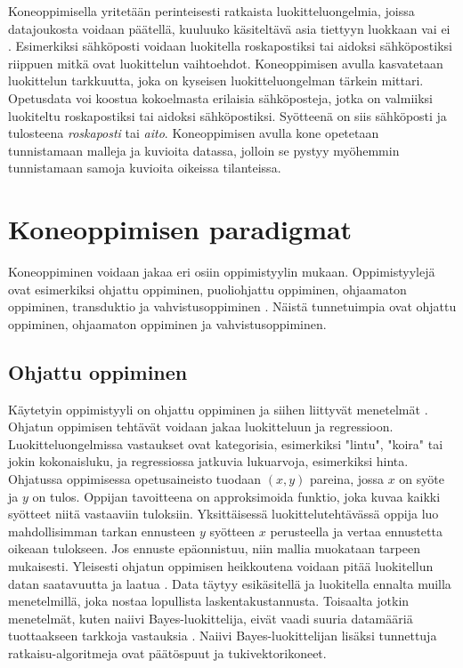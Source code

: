\documentclass[utf8]{gradu3}
\begin{document}
Koneoppimisella yritetään perinteisesti ratkaista luokitteluongelmia, joissa datajoukosta voidaan päätellä, kuuluuko käsiteltävä asia tiettyyn luokkaan vai ei \parencite{jordan2015machine}. Esimerkiksi sähköposti voidaan luokitella roskapostiksi tai aidoksi sähköpostiksi riippuen mitkä ovat luokittelun vaihtoehdot. Koneoppimisen avulla kasvatetaan luokittelun tarkkuutta, joka on kyseisen luokitteluongelman tärkein mittari. Opetusdata voi koostua kokoelmasta erilaisia sähköposteja, jotka on valmiiksi luokiteltu roskapostiksi tai aidoksi sähköpostiksi. Syötteenä on siis sähköposti ja tulosteena \textit{roskaposti} tai \textit{aito}. Koneoppimisen avulla kone opetetaan tunnistamaan malleja ja kuvioita datassa, jolloin se pystyy myöhemmin tunnistamaan samoja kuvioita oikeissa tilanteissa.

\section{Koneoppimisen paradigmat}

Koneoppiminen voidaan jakaa eri osiin oppimistyylin mukaan. Oppimistyylejä ovat esimerkiksi ohjattu oppiminen, puoliohjattu oppiminen, ohjaamaton oppiminen, transduktio ja vahvistusoppiminen \parencite{das2017survey}. Näistä tunnetuimpia ovat ohjattu oppiminen, ohjaamaton oppiminen ja vahvistusoppiminen.

\subsection{Ohjattu oppiminen}

Käytetyin oppimistyyli on ohjattu oppiminen ja siihen liittyvät menetelmät \parencite{jordan2015machine,nasteski2017overview}. Ohjatun oppimisen tehtävät voidaan jakaa luokitteluun ja regressioon. Luokitteluongelmissa vastaukset ovat kategorisia, esimerkiksi "lintu", "koira" tai jokin kokonaisluku, ja regressiossa jatkuvia lukuarvoja, esimerkiksi hinta. Ohjatussa oppimisessa opetusaineisto tuodaan \((x,y)\) pareina, jossa \(x\) on syöte ja \(y\) on tulos. Oppijan tavoitteena on approksimoida funktio, joka kuvaa kaikki syötteet niitä vastaaviin tuloksiin. Yksittäisessä luokittelutehtävässä oppija luo mahdollisimman tarkan ennusteen \(y\) syötteen \(x\) perusteella ja vertaa ennustetta oikeaan tulokseen. Jos ennuste epäonnistuu, niin mallia muokataan tarpeen mukaisesti. Yleisesti ohjatun oppimisen heikkoutena voidaan pitää luokitellun datan saatavuutta ja laatua \parencite{das2017survey}. Data täytyy esikäsitellä ja luokitella ennalta muilla menetelmillä, joka nostaa lopullista laskentakustannusta. Toisaalta jotkin menetelmät, kuten naiivi Bayes-luokittelija, eivät vaadi suuria datamääriä tuottaakseen tarkkoja vastauksia \parencite{osisanwo2017supervised}. Naiivi Bayes-luokittelijan lisäksi tunnettuja ratkaisu-algoritmeja ovat päätöspuut ja tukivektorikoneet.
\end{document}
